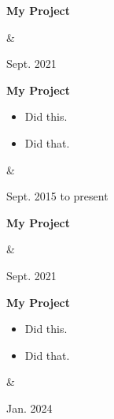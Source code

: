 \documentclass[10pt, letterpaper]{article}
\newenvironment{highlights}{
        \begin{itemize}[
                topsep=0pt,
                parsep=0.10 cm,
                partopsep=0pt,
                itemsep=0pt,
                after=\vspace{-1\baselineskip},
                leftmargin=0.4 cm + 3pt
            ]
    }{
        \end{itemize}
    } %
\let\originalTabularx\tabularx
\let\originalEndTabularx\endtabularx
\renewenvironment{tabularx}{\bgroup\centering\originalTabularx}{\originalEndTabularx\par\egroup}
\begin{document}
        \vspace{0.2 cm}
        \begin{tabularx}{
            \textwidth-0.4 cm-0.13cm
        }{
            K{0.2 cm}
            R{4.1 cm}
        }
            \textbf{My Project}

            \vspace{0.10 cm}

            &
            

            Sept. 2021
        \end{tabularx}


        \vspace{0.2 cm}
        \begin{tabularx}{
            \textwidth-0.4 cm-0.13cm
        }{
            K{0.2 cm}
            R{4.1 cm}
        }
            \textbf{My Project}

            \vspace{0.10 cm}

            \begin{highlights}
                \item Did this.
                \item Did that.
            \end{highlights}
            &
            

            Sept. 2015 to present
        \end{tabularx}


        \vspace{0.2 cm}
        \begin{tabularx}{
            \textwidth-0.4 cm-0.13cm
        }{
            K{0.2 cm}
            R{4.1 cm}
        }
            \textbf{My Project}

            \vspace{0.10 cm}

            &
            

            Sept. 2021
        \end{tabularx}


        \vspace{0.2 cm}
        \begin{tabularx}{
            \textwidth-0.4 cm-0.13cm
        }{
            K{0.2 cm}
            R{4.1 cm}
        }
            \textbf{My Project}

            \vspace{0.10 cm}

            \begin{highlights}
                \item Did this.
                \item Did that.
            \end{highlights}
            &
            

            Jan. 2024
        \end{tabularx}
\end{document}
